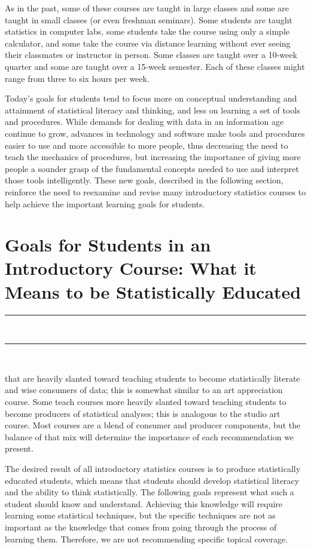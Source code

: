 \documentclass[twoside,openany]{tufte-book}
\begin{document}
As in the past, some of these courses are taught in large classes and some are taught in small classes (or even freshman seminars). Some students are taught statistics in computer labs, some students take the course using only a simple calculator, and some take the course via distance learning without ever seeing their classmates or instructor in person.  Some classes are taught over a 10-week quarter and some are taught over a 15-week semester. Each of these classes might range from three to six hours per week.
 
Today's goals for students tend to focus more on conceptual understanding and attainment of statistical literacy and thinking, and less on learning a set of tools and procedures. While demands for dealing with data in an information age continue to grow, advances in technology and software make tools and procedures easier to use and more accessible to more people, thus decreasing the need to teach the mechanics of procedures, but increasing the importance of giving more people a sounder grasp of the fundamental concepts needed to use and interpret those tools intelligently. These new goals, described in the following section, reinforce the need to reexamine and revise many introductory statistics courses to help achieve the important learning goals for students.


\chapter{Goals for Students in an Introductory Course: What it Means to be Statistically Educated}
\vspace{-.53in}
   \noindent\color{graylight}\rule[0cm]{3.25in}{0.03cm} \\
    \noindent\color{graylight}\rule[0.4cm]{3.25in}{0.03cm} \\
\color{black}
\vspace{.05in}

 that are heavily slanted toward teaching students to become statistically literate and wise consumers of data; this is somewhat similar to an art appreciation course. Some teach courses more heavily slanted toward teaching students to become producers of statistical analyses; this is analogous to the studio art course. Most courses are a blend of consumer and producer components, but the balance of that mix will determine the importance of each recommendation we present.   

The desired result of all introductory statistics courses is to produce statistically educated students, which means that students should develop statistical literacy and the ability to think statistically. The following goals represent what such a student should know and understand. Achieving this knowledge will require learning some statistical techniques, but the specific techniques are not as important as the knowledge that comes from going through the process of learning them. Therefore, we are not recommending specific topical coverage.\\
\vspace{12pt}
\end{document}
